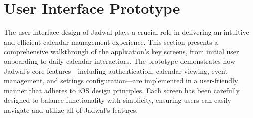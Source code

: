 \section{User Interface Prototype}

The user interface design of Jadwal plays a crucial role in delivering an intuitive and efficient calendar management experience. This section presents a comprehensive walkthrough of the application's key screens, from initial user onboarding to daily calendar interactions. The prototype demonstrates how Jadwal's core features—including authentication, calendar viewing, event management, and settings configuration—are implemented in a user-friendly manner that adheres to iOS design principles. Each screen has been carefully designed to balance functionality with simplicity, ensuring users can easily navigate and utilize all of Jadwal's features.

